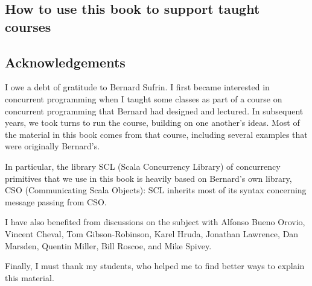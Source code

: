 

\subsection*{How to use this book to support taught courses}






\subsection*{Acknowledgements}

I owe a debt of gratitude to Bernard Sufrin.  I first became interested in
concurrent programming when I taught some classes as part of a course on
concurrent programming that Bernard had designed and lectured.  In subsequent
years, we took turns to run the course, building on one another's ideas.  Most
of the material in this book comes from that course, including several
examples that were originally Bernard's.

In particular, the library SCL (Scala Concurrency Library) of concurrency
primitives that we use in this book is heavily based on Bernard's own library,
CSO (Communicating Scala Objects): SCL inherits most of its syntax concerning
message passing from CSO.

I have also benefited from discussions on the subject with
Alfonso Bueno  Orovio,
Vincent Cheval, 
Tom Gibson-Robinson, 
Karel Hruda,
Jonathan Lawrence,
Dan Marsden,
Quentin Miller,
Bill Roscoe, and
Mike Spivey.
\framebox{\ldots}  

Finally, I must thank my students, who helped me to find better ways to
explain this material. 
